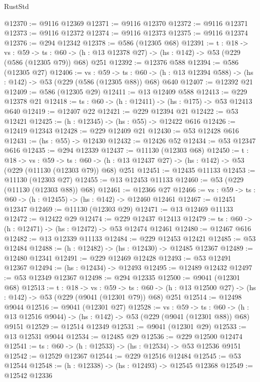 \begin{lexlean}{RustStd}
\begin{coremodule}
@12370 := @9116 @12369
@12371 := @9116 @12370
@12372 := @9116 @12371
@12373 := @9116 @12372
@12374 := @9116 @12373
@12375 := @9116 @12374
@12376 := @294 @12342
@12378 := @586 (@12305 @68)
@12391 := {t : @18} ->
  {vs : @59} ->
  {ts : @60} -> (h : @13 @12378 @27) -> (hs : @142) -> @53 (@229 (@586 (@12305 @79)) @68) @251
@12392 := @12376 @588
@12394 := @586 (@12305 @27)
@12406 := {vs : @59} ->
  {ts : @60} -> (h : @13 @12394 @588) -> (hs : @142) -> @53 (@229 (@586 (@12305 @88)) @68) @640
@12407 := @12392 @21
@12409 := @586 (@12305 @29)
@12411 := @13 @12409 @588
@12413 := @229 @12378 @21
@12418 := {ts : @60} -> (h : @12411) -> (hs : @175) -> @53 @12413 @640
@12419 := @12407 @22
@12421 := @229 @12394 @21
@12422 := @53 @12421
@12425 := (h : @12345) -> (hs : @55) -> @12422 @616
@12426 := @12419 @12343
@12428 := @229 @12409 @21
@12430 := @53 @12428 @616
@12431 := (hs : @55) -> @12430
@12432 := @12426 @52
@12434 := @53 @12347 @616
@12435 := @294 @12339
@12437 := @11130 (@12303 @68)
@12450 := {t : @18} ->
  {vs : @59} ->
  {ts : @60} -> (h : @13 @12437 @27) -> (hs : @142) -> @53 (@229 (@11130 (@12303 @79)) @68) @251
@12451 := @12435 @11133
@12453 := @11130 (@12303 @27)
@12455 := @13 @12453 @11133
@12460 := @53 (@229 (@11130 (@12303 @88)) @68)
@12461 := @12366 @27
@12466 := {vs : @59} -> {ts : @60} -> (h : @12455) -> (hs : @142) -> @12460 @12461
@12467 := @12451 @12347
@12469 := @11130 (@12303 @29)
@12471 := @13 @12469 @11133
@12472 := @12422 @29
@12474 := @229 @12437 @12413
@12479 := {ts : @60} -> (h : @12471) -> (hs : @12472) -> @53 @12474 @12461
@12480 := @12467 @616
@12482 := @13 @12339 @11133
@12484 := @229 @12453 @12421
@12485 := @53 @12484
@12488 := (h : @12482) -> (hs : @12430) -> @12485 @12367
@12489 := @12480 @12341
@12491 := @229 @12469 @12428
@12493 := @53 @12491 @12367
@12494 := (hs : @12434) -> @12493
@12495 := @12489 @12432
@12497 := @53 @12349 @12367
@12498 := @294 @12335
@12500 := @9041 (@12301 @68)
@12513 := {t : @18} ->
  {vs : @59} ->
  {ts : @60} -> (h : @13 @12500 @27) -> (hs : @142) -> @53 (@229 (@9041 (@12301 @79)) @68) @251
@12514 := @12498 @9044
@12516 := @9041 (@12301 @27)
@12528 := {vs : @59} ->
  {ts : @60} -> (h : @13 @12516 @9044) -> (hs : @142) -> @53 (@229 (@9041 (@12301 @88)) @68) @9151
@12529 := @12514 @12349
@12531 := @9041 (@12301 @29)
@12533 := @13 @12531 @9044
@12534 := @12485 @29
@12536 := @229 @12500 @12474
@12541 := {ts : @60} -> (h : @12533) -> (hs : @12534) -> @53 @12536 @9151
@12542 := @12529 @12367
@12544 := @229 @12516 @12484
@12545 := @53 @12544
@12548 := (h : @12338) -> (hs : @12493) -> @12545 @12368
@12549 := @12542 @12336

\end{coremodule}
\end{lexlean}
